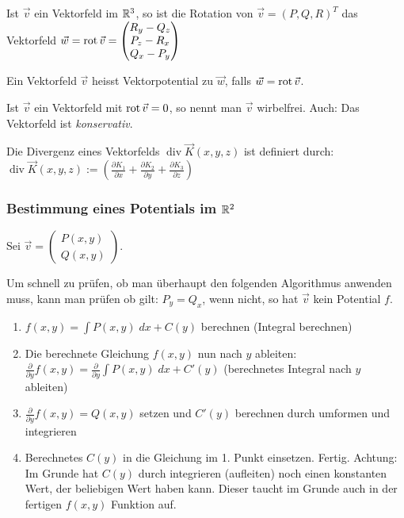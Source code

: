 \begin{definition}
Ist $\vec{v}$ ein Vektorfeld im $\mathbb{R}^3$, so ist die Rotation von $\vec{v} = (P, Q, R)^T$ das Vektorfeld
$\vec{w} = \operatorname{rot} \vec{v} = \begin{pmatrix}
R_y - Q_z\\
P_z - R_x\\
Q_x - P_y
\end{pmatrix}$
\end{definition}

\begin{definition}[Vektorpotential]
Ein Vektorfeld $\vec{v}$ heisst Vektorpotential zu $\vec{w}$, falls $\vec{w} = \operatorname{rot} \vec{v}$.
\end{definition}

\begin{definition}
Ist $\vec{v}$ ein Vektorfeld mit $\operatorname{rot} \vec{v} = 0$, so nennt man $\vec{v}$ wirbelfrei. Auch: Das Vektorfeld ist \emph{konservativ}.
\end{definition}

\begin{definition}[Divergenz]
Die Divergenz eines Vektorfelds $\operatorname{div} \vec{K}(x,y,z)$ ist definiert durch:
$\operatorname{div} \vec{K}(x,y,z) := \left( \frac{\partial
K_1}{\partial x} + \frac{\partial K_2}{\partial y} + \frac{\partial
K_3}{\partial z} \right)$
\end{definition}

\subsubsection{Bestimmung eines Potentials im $\mathbb{R}^2$}
Sei $\vec{v} = \begin{pmatrix}
P(x,y)\\
Q(x,y)
\end{pmatrix}$.

Um schnell zu prüfen, ob man überhaupt den folgenden Algorithmus anwenden muss,
kann man prüfen ob gilt: $P_y = Q_x$, wenn nicht, so hat $\vec{v}$ kein Potential $f$.

\begin{enumerate}[itemsep=1em]
	\item $f(x,y) = \int P(x,y)\;dx + C(y)$ berechnen (Integral berechnen)
	\item Die berechnete Gleichung $f(x,y)$ nun nach $y$ ableiten:
	$\frac{\partial}{\partial y} f(x,y) = \frac{\partial}{\partial y}\int P(x,y)\;dx + C'(y)$
	(berechnetes Integral nach $y$ ableiten)
	\item $\frac{\partial}{\partial y} f(x,y) = Q(x,y)$ setzen und $C'(y)$ berechnen durch umformen
	und integrieren
	\item Berechnetes $C(y)$ in die Gleichung im 1. Punkt einsetzen. Fertig. Achtung: Im Grunde hat
	$C(y)$ durch integrieren (aufleiten) noch einen konstanten Wert, der beliebigen Wert haben kann.
	Dieser taucht im Grunde auch in der fertigen $f(x,y)$ Funktion auf.
\end{enumerate}

